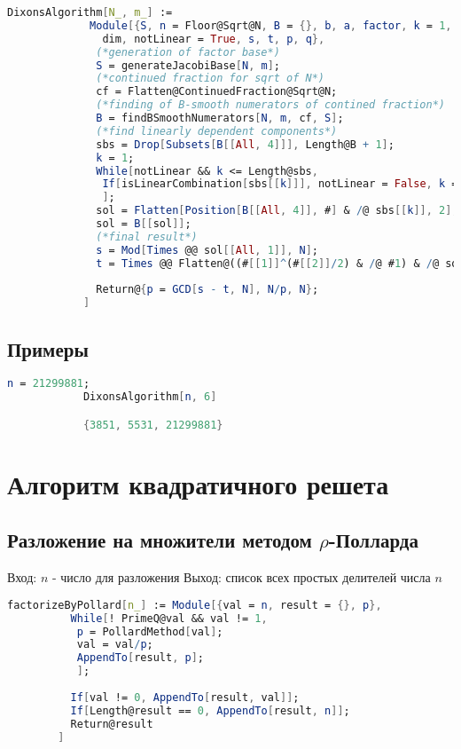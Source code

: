 			\begin{lstlisting}[language=Mathematica,caption={
      			Алгоритм Диксона
    		}]
			DixonsAlgorithm[N_, m_] := 
			 Module[{S, n = Floor@Sqrt@N, B = {}, b, a, factor, k = 1, cf, e, sbs, sol, 
			   dim, notLinear = True, s, t, p, q},
			  (*generation of factor base*)
			  S = generateJacobiBase[N, m];
			  (*continued fraction for sqrt of N*)
			  cf = Flatten@ContinuedFraction@Sqrt@N;
			  (*finding of B-smooth numerators of contined fraction*)
			  B = findBSmoothNumerators[N, m, cf, S];
			  (*find linearly dependent components*)
			  sbs = Drop[Subsets[B[[All, 4]]], Length@B + 1];
			  k = 1;
			  While[notLinear && k <= Length@sbs,
			   If[isLinearCombination[sbs[[k]]], notLinear = False, k = k + 1];
			   ];
			  sol = Flatten[Position[B[[All, 4]], #] & /@ sbs[[k]], 2];
			  sol = B[[sol]];
			  (*final result*)
			  s = Mod[Times @@ sol[[All, 1]], N];
			  t = Times @@ Flatten@((#[[1]]^(#[[2]]/2) & /@ #1) & /@ sol[[All, 3]]);
			  
			  Return@{p = GCD[s - t, N], N/p, N};
			]
	    	\end{lstlisting}

    	\subsection{Примеры}

    		\begin{lstlisting}[language=Mathematica,caption={
	      		Пример 1
	    	}]
			n = 21299881;
			DixonsAlgorithm[n, 6]

			{3851, 5531, 21299881}
	    	\end{lstlisting}

	\section{Алгоритм квадратичного решета}
		\subsection{Разложение на множители методом $\rho$-Полларда}
    		Вход: $n$ - число для разложения
    		Выход: список всех простых делителей числа $n$

    		\begin{lstlisting}[language=Mathematica,caption={
	      		Разложение на множители
	    	}]
		factorizeByPollard[n_] := Module[{val = n, result = {}, p},
		  While[! PrimeQ@val && val != 1,
		   p = PollardMethod[val];
		   val = val/p;
		   AppendTo[result, p];
		   ];
		  
		  If[val != 0, AppendTo[result, val]];
		  If[Length@result == 0, AppendTo[result, n]];
		  Return@result
		]
	    	\end{lstlisting}

